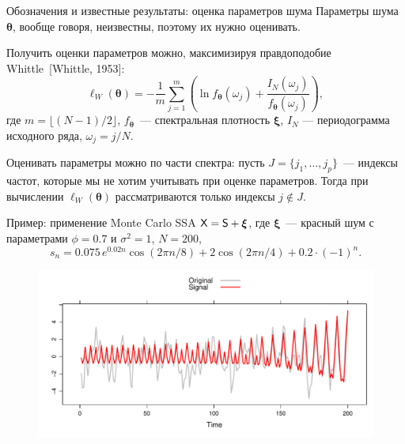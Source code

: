 \documentclass[notheorems, handout]{beamer}
\begin{document}
\begin{frame}{Обозначения и известные результаты: оценка параметров шума}
	Параметры шума $\bm\theta$, вообще говоря, неизвестны, поэтому их нужно оценивать.\medskip

	Получить оценки параметров можно, максимизируя правдоподобие Whittle~[Whittle, 1953]:
	$$
	\ell_W(\bm\theta)=-\frac{1}{m}\sum_{j=1}^m\left(\ln f_{\bm\theta}(\omega_j)+\frac{I_N(\omega_j)}{f_{\bm\theta}(\omega_j)}\right),
	$$
	где $m=\lfloor (N-1)/2\rfloor$, $f_{\bm\theta}$~--- спектральная плотность $\bm\xi$, $I_N$ --- периодограмма исходного ряда, $\omega_j=j/N$.\medskip

	Оценивать параметры можно по части спектра: пусть $J=\{j_1, \ldots, j_p\}$~--- индексы частот, которые мы не хотим учитывать при оценке параметров. Тогда при вычислении $\ell_W(\bm\theta)$ рассматриваются только индексы $j\not\in J$.
\end{frame}

\begin{frame}{Пример: применение Monte Carlo SSA}
	$\mathsf{X}=\mathsf{S}+\boldsymbol{\xi}$, где $\boldsymbol{\xi}$~--- красный шум с параметрами $\phi=0.7$ и $\sigma^2=1$, $N=200$,
	$$
	s_n=0.075\,e^{0.02n}\cos(2\pi n / 8) + 2\cos(2\pi n / 4) + 0.2\cdot (-1)^n.
	$$
	\begin{figure}
		\centering
		\includegraphics[width=\textwidth]{img/noise_ts_signal.pdf}
	\end{figure}
\end{frame}
\end{document}
